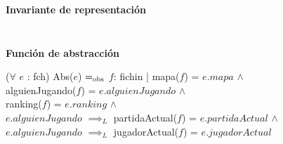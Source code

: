 \documentclass{book}
\begin{document}
    $ $

    \textbf{Invariante de representación}



    $ $

    $ $

    \textbf{Función de abstracción}

        ($\forall$ $e$ : fch) Abs($e$) $=_{\mathrm{obs}}$ $f$: fichin | mapa($f$) = $e.mapa$ $\wedge$ \\
            \text{}\quad\qquad alguienJugando($f$) = $e.alguienJugando$ $\wedge$ \\
            \text{}\quad\qquad ranking($f$) = $e.ranking$ $\wedge$ \\
            \text{}\quad\qquad $e.alguienJugando$ $\implies_L$ partidaActual($f$) = $e.partidaActual$ $\wedge$ \\
            \text{}\quad\qquad $e.alguienJugando$ $\implies_L$ jugadorActual($f$) = $e.jugadorActual$
\end{document}
